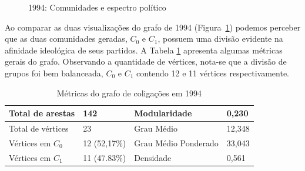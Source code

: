 \begin{figure}[h]
\center
    \qquad
    
    \caption{1994: Comunidades e espectro político}
    \label{fig:grafos-1994}
\end{figure}

Ao comparar as duas visualizações do grafo de 1994 (Figura~\ref{fig:grafos-1994}) podemos perceber que as duas comunidades geradas, $C_0$ e $C_1$, possuem uma divisão evidente na afinidade ideológica de seus partidos. A Tabela \ref{table-1994} apresenta algumas métricas gerais do grafo. Observando a quantidade de vértices, nota-se que a divisão de grupos foi bem balanceada, $C_0$ e $C_1$ contendo 12 e 11 vértices respectivamente.

\begin{table}[h]
\centering
\begin{tabular}{|l|l|l|l|}
\hline
Total de arestas  & 142 & Modularidade         & 0,230 \\ \hline
Total de vértices & 23   & Grau Médio           & 12,348 \\ \hline
Vértices em $C_0$    & 12 (52,17\%)  & Grau Médio Ponderado & 33,043 \\ \hline
Vértices em $C_1$    & 11 (47.83\%) & Densidade            &  0,561\\ \hline
\end{tabular}
\caption{Métricas do grafo de coligações em 1994}
\label{table-1994}
\end{table}

